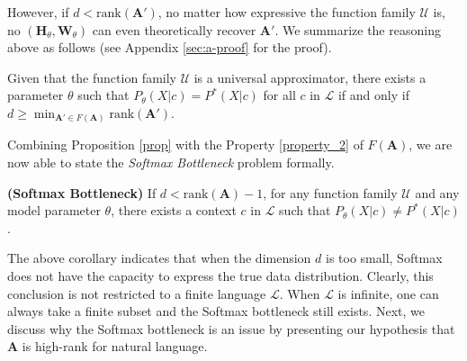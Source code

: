 However, if $d < \text{rank}(\mathbf{A}')$, no matter how expressive the function family $\mathcal{U}$ is,  no $(\mathbf{H}_\theta, \mathbf{W}_\theta)$ can even theoretically recover $\mathbf{A}'$.
We summarize the reasoning above as follows (see Appendix \ref{sec:a-proof} for the proof).
\begin{prop}\label{prop}
	Given that the function family $\mathcal{U}$ is a universal approximator, there exists a parameter $\theta$ such that $P_\theta(X | c) = P^*(X | c)$ for all $c$ in $\mathcal{L}$ if and only if
	$d \geq \min_{\mathbf{A}' \in F(\mathbf{A})} \text{rank}(\mathbf{A}')$.
\end{prop}

Combining Proposition \ref{prop} with the Property \ref{property_2} of $F(\mathbf{A})$, we are now able to state the \textit{Softmax Bottleneck} problem formally.
\begin{coro}
\textbf{(Softmax Bottleneck)}
If $d < \text{rank}(\mathbf{A}) - 1$, for any function family $\mathcal{U}$ and any model parameter $\theta$, there exists a context $c$ in $\mathcal{L}$ such that $P_\theta(X | c) \not= P^*(X | c)$.
\end{coro}
The above corollary indicates that when the dimension $d$ is too small, Softmax does not have the capacity to express the true data distribution. Clearly, this conclusion is not restricted to a finite language $\mathcal{L}$. When $\mathcal{L}$ is infinite, one can always take a finite subset and the Softmax bottleneck still exists.
Next, we discuss why the Softmax bottleneck is an issue by presenting our hypothesis that $\mathbf{A}$ is high-rank for natural language.

